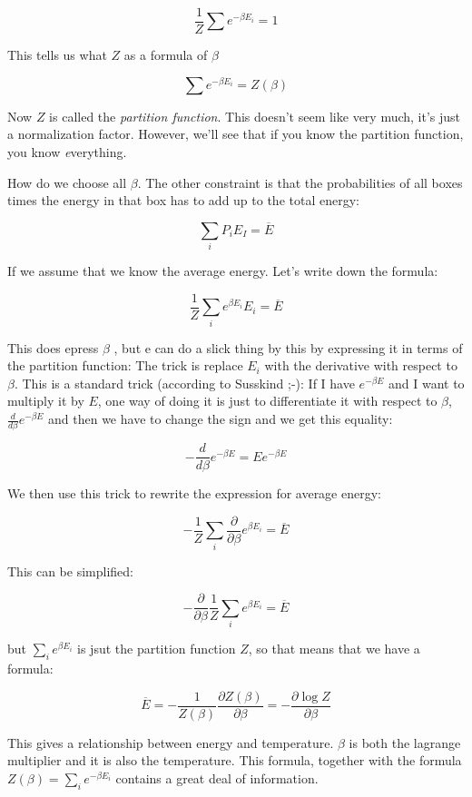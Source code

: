 \documentclass[a4, 12pt, english, USenglish]{scrreprt}
\newcommand{\idx}[1]{{\em #1}\index{#1}}
\begin{document}
\[
\frac{1}{Z} \sum e^{-\beta E_i} = 1
\]

This tells us what \(Z\) as a formula of \(\beta\)


\[
\sum e^{-\beta E_i} = Z(\beta)
\]

Now \(Z\) is called the \idx{partition function}.  This doesn't seem
like very much, it's just a normalization factor.  However, we'll see
that if you know the partition function, you know {\idx everything}.


How do we choose all \(\beta\).  The other constraint is that the
probabilities of all boxes times the energy in that box has to add up
to the total energy:

\[
\sum_i P_i E_I = \overbar{E}
\]

If we assume that we know the average energy.  Let's write down the
formula:

\[
  \frac{1}{Z}\sum_i e^{\beta E_i} E_i = \overbar{E}
\]

This does epress \(\beta\) , but e can do a slick thing by this by
expressing it in terms of the partition function:   The trick is
replace \(E_i\) with the derivative with respect to \(\beta\).   This
is a standard trick (according to Susskind ;-): If I have \(e^{-\beta
  E}\) and I want to multiply it by \(E\), one way of doing it is just
to differentiate it with respect to \(\beta\), \(\frac{d}{d\beta}
e^{-\beta E}\) and then we have to change the sign and we get this
equality:

\[
-\frac{d}{d\beta}e^{-\beta E} = E e^{-\beta E}
\]

We then use this trick to rewrite the expression for average energy:


\[
  - \frac{1}{Z}\sum_i \frac{\partial}{\partial\beta} e^{\beta E_i} = \overbar{E}
\]

This can be simplified:

\[
  -\frac{\partial}{\partial\beta}  \frac{1}{Z}\sum_i e^{\beta E_i} =  \overbar{E} 
\]

but \(\sum_i e^{\beta E_i}\) is jsut the partition function \(Z\), so that
means that we have a formula:

\[
\overbar{E} = -\frac{1}{Z(\beta)} \frac{\partial Z(\beta)}{\partial
  \beta} = - \frac{\partial\log Z}{\partial\beta}
\]


This gives a relationship between energy and temperature.  
\(\beta\) is both the lagrange multiplier and it is also the
temperature.  This formula, together with the formula \(Z(\beta) =
\sum_i e^{-\beta E_i}\) contains a great deal of information.
\end{document}
